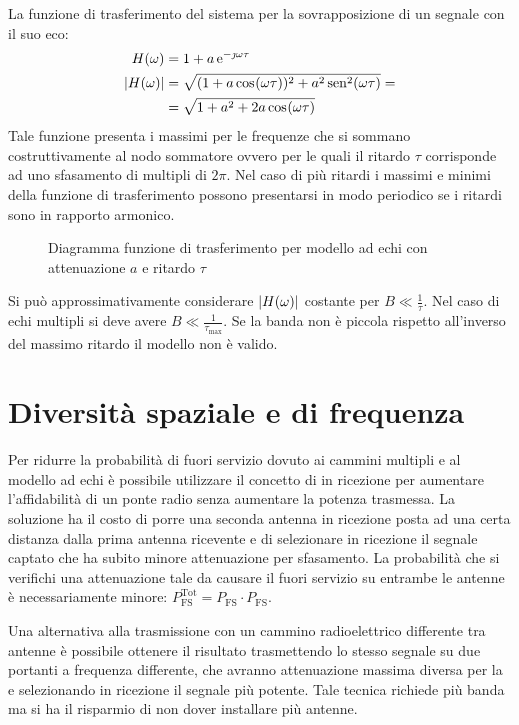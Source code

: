 La funzione di trasferimento del sistema per la sovrapposizione di un segnale con il suo eco:
\begin{equation}\begin{split}
H(\omega)&=1+a\e{-\jmath\omega\tau}\\
\abs{H(\omega)}&=\sqrt{(1+a\cos{\omega\tau})^2+a^2\sen[2]{\omega\tau}}=\\&=\sqrt{1+a^2+2a\cos{\omega\tau}}
\end{split}\end{equation}
Tale funzione presenta i massimi per le frequenze che si sommano costruttivamente al nodo sommatore ovvero per le quali il ritardo $\tau$ corrisponde ad uno sfasamento di multipli di $2\pi$. Nel caso di più ritardi i massimi e minimi della funzione di trasferimento possono presentarsi in modo periodico se i ritardi sono in rapporto armonico.
\begin{figure}[!ht]\centering
{}
\caption{Diagramma funzione di trasferimento per modello ad echi con attenuazione $a$ e ritardo $\tau$}
\label{fig:ritardo_echi}
\end{figure}

Si può approssimativamente considerare $\abs{H(\omega)}$ costante per $B\ll\frac{1}{\tau}$. Nel caso di echi multipli si deve avere $B\ll\frac{1}{\tau_\text{max}}$. Se la banda non è piccola rispetto all'inverso del massimo ritardo il modello non è valido.


\section{Diversità spaziale e di frequenza}
Per ridurre la probabilità di fuori servizio dovuto ai cammini multipli e al modello ad echi è possibile utilizzare il concetto di  in ricezione per aumentare l'affidabilità di un ponte radio senza aumentare la potenza trasmessa. La soluzione ha il costo di porre una seconda antenna in ricezione posta ad una certa distanza dalla prima antenna ricevente e di selezionare in ricezione il segnale captato che ha subito minore attenuazione per sfasamento. La probabilità che si verifichi una attenuazione tale da causare il fuori servizio su entrambe le antenne è necessariamente minore: $P_\text{FS}^\text{Tot}=P_\text{FS}\cdot P_\text{FS}$.

Una alternativa alla trasmissione con un cammino radioelettrico differente tra antenne è possibile ottenere il risultato trasmettendo lo stesso segnale su due portanti a frequenza differente, che avranno attenuazione massima diversa per la  e selezionando in ricezione il segnale più potente. Tale tecnica richiede più banda ma si ha il risparmio di non dover installare più antenne.
